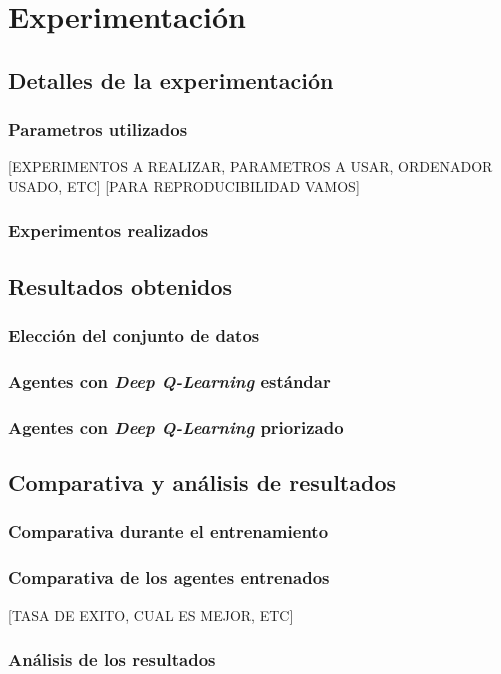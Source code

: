 \chapter{Experimentación}

\section{Detalles de la experimentación}

\subsection{Parametros utilizados}
[EXPERIMENTOS A REALIZAR, PARAMETROS A USAR, ORDENADOR USADO, ETC]
[PARA REPRODUCIBILIDAD VAMOS]

\subsection{Experimentos realizados}

\section{Resultados obtenidos}

\subsection{Elección del conjunto de datos}

\subsection{Agentes con \textit{Deep Q-Learning} estándar}

\subsection{Agentes con \textit{Deep Q-Learning} priorizado}

\section{Comparativa y análisis de resultados}

\subsection{Comparativa durante el entrenamiento}

\subsection{Comparativa de los agentes entrenados}
[TASA DE EXITO, CUAL ES MEJOR, ETC]

\subsection{Análisis de los resultados}